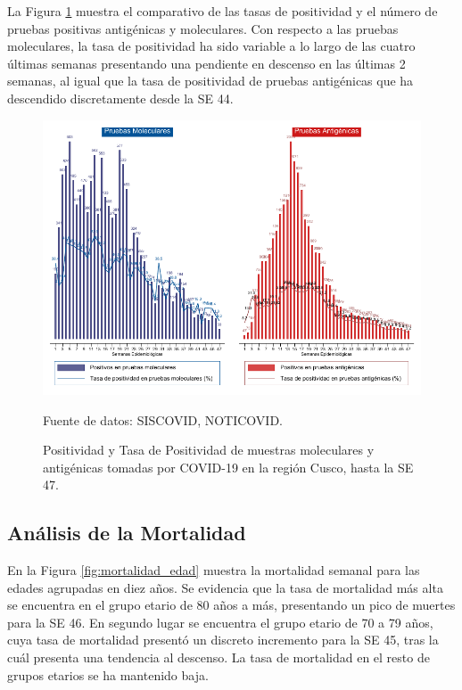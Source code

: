 \documentclass[12pt,a4paper,openany]{book}
\begin{document}
La Figura \ref{fig:positividad_ambas} muestra el comparativo de las tasas de positividad y el número de pruebas positivas antigénicas y moleculares. Con respecto a las pruebas moleculares, la tasa de positividad ha sido variable a lo largo de las cuatro últimas semanas presentando una pendiente en descenso en las últimas 2 semanas, al igual que la tasa de positividad de pruebas antigénicas que ha descendido discretamente desde la SE 44.  

\begin{landscape}
   \begin{figure}[h]
	\caption{Positividad y Tasa de Positividad de muestras moleculares y antigénicas tomadas por COVID-19 en la región Cusco, hasta la SE 47.}\label{fig:positividad_ambas}
   	\begin{center}
   		\includegraphics[width=0.85\linewidth]{../figuras/positividad_ambas.pdf}
   	\end{center}
   	{\footnotesize {Fuente de datos: SISCOVID, NOTICOVID.}}
   \end{figure}
\end{landscape}
\clearpage

	\subsection*{Análisis de la Mortalidad}

	\noindent En la Figura \ref{fig:mortalidad_edad} muestra la mortalidad semanal para las edades agrupadas en diez años. Se evidencia que la tasa de mortalidad más alta se encuentra en el grupo etario de 80 años a más, presentando un pico de muertes para la SE 46. En segundo lugar se encuentra el grupo etario de 70 a 79 años, cuya tasa de mortalidad presentó un discreto incremento para la SE 45, tras la cuál presenta una tendencia al descenso. La tasa de mortalidad en el resto de grupos etarios se ha mantenido baja.
	
\end{document}
